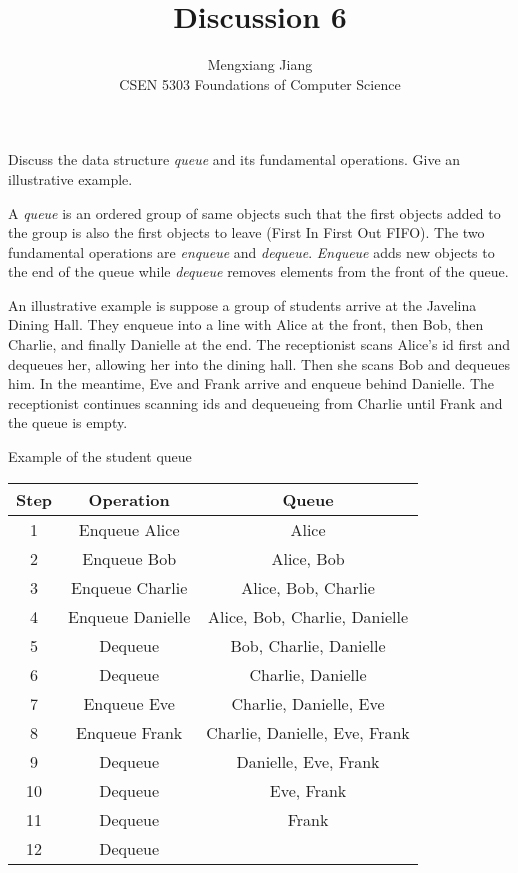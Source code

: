 \documentclass[12pt]{article}
\newenvironment{problem}[2][Problem]{\begin{trivlist}
\item[\hskip \labelsep {\bfseries #1}\hskip \labelsep {\bfseries #2.}]}{\end{trivlist}}
\begin{document}
 
 
\title{Discussion 6}%
\author{Mengxiang Jiang\\ %
CSEN 5303 Foundations of Computer Science} %
 
\maketitle
 
\begin{problem}{1} %
Discuss the data structure \emph{queue} and its fundamental operations. Give an illustrative example.

A \emph{queue} is an ordered group of same objects such that 
the first objects added to the group is also the first objects to leave (First In First Out FIFO). 
The two fundamental operations are \emph{enqueue} and \emph{dequeue}.
\emph{Enqueue} adds new objects to the end of the queue while \emph{dequeue} removes elements from the front of the queue.

An illustrative example is suppose a group of students arrive at the Javelina Dining Hall.
They enqueue into a line with Alice at the front, then Bob, then Charlie, and finally Danielle at the end. 
The receptionist scans Alice's id first and dequeues her, allowing her into the dining hall.
Then she scans Bob and dequeues him. In the meantime, Eve and Frank arrive and enqueue behind Danielle.
The receptionist continues scanning ids and dequeueing from Charlie until Frank and the queue is empty.\\

\begin{center}
Example of the student queue\\
\begin{tabular}{|c c c|} 
 \hline
 Step & Operation & Queue \\
 \hline
 1 & Enqueue Alice & Alice \\ 
 2 & Enqueue Bob & Alice, Bob \\
 3 & Enqueue Charlie & Alice, Bob, Charlie \\
 4 & Enqueue Danielle & Alice, Bob, Charlie, Danielle \\
 5 & Dequeue & Bob, Charlie, Danielle \\
 6 & Dequeue & Charlie, Danielle \\
 7 & Enqueue Eve & Charlie, Danielle, Eve \\
 8 & Enqueue Frank & Charlie, Danielle, Eve, Frank \\
 9 & Dequeue & Danielle, Eve, Frank \\
 10 & Dequeue & Eve, Frank \\
 11 & Dequeue & Frank \\
 12 & Dequeue &  \\
 \hline
\end{tabular}
\end{center}
\end{problem}
\end{document}
